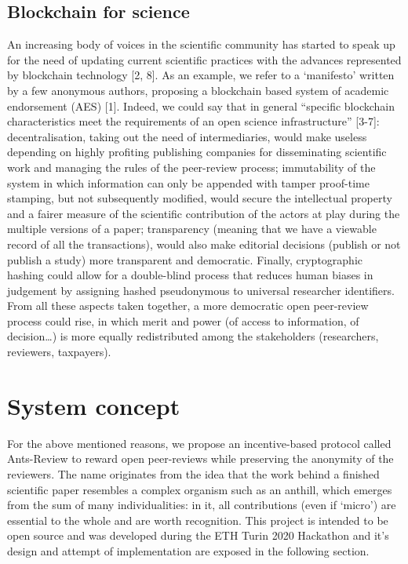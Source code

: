 \documentclass[runningheads]{llncs}
\begin{document}
\subsection{Blockchain for science}
An increasing body of voices in the scientific community has started to speak up for the need of updating current scientific practices with the advances represented by blockchain technology [2, 8]. As an example, we refer to a ‘manifesto’ written by a few anonymous authors, proposing a blockchain based system of academic endorsement (AES) [1]. Indeed, we could say that in general “specific blockchain characteristics meet the requirements of an open science infrastructure” [3-7]: decentralisation, taking out the need of intermediaries, would make useless depending on highly profiting publishing companies for disseminating scientific work and managing the rules of the peer-review process; immutability of the system in which information can only be appended with tamper proof-time stamping,  but not subsequently modified, would secure the intellectual property and a fairer measure of the scientific contribution of the actors at play during the multiple versions of a paper; transparency (meaning that we have a viewable record of all the transactions), would also make editorial decisions (publish or not publish a study) more transparent and democratic. Finally, cryptographic hashing could allow for a double-blind process that reduces human biases in judgement by assigning hashed pseudonymous to universal researcher identifiers. From all these aspects taken together, a more democratic open peer-review  process could rise, in which merit and power (of access to information, of decision…) is more equally redistributed among the stakeholders (researchers, reviewers, taxpayers).

\section{System concept}
For the above mentioned reasons, we propose an incentive-based protocol called Ants-Review to reward open peer-reviews while preserving the anonymity of the reviewers. The name originates from the idea that the work behind a finished scientific paper resembles a complex organism such as an anthill, which emerges from the sum of many individualities: in it, all contributions (even if ‘micro’) are essential to the whole and are worth recognition.
This project is intended to be open source and was developed during the ETH Turin 2020 Hackathon and it’s design and attempt of implementation are exposed in the following section. 
\end{document}
